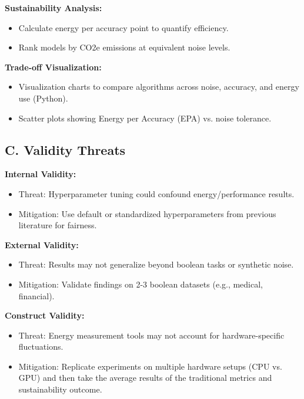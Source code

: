 \documentclass[conference]{IEEEtran}
\begin{document}
\textbf{Sustainability Analysis:}
\begin{itemize}
    \item Calculate energy per accuracy point to quantify efficiency.
    \item Rank models by CO2e emissions at equivalent noise levels.
\end{itemize}

\textbf{Trade-off Visualization:}
\begin{itemize}
    \item Visualization charts to compare algorithms across noise, accuracy, and energy use (Python).
    \item Scatter plots showing Energy per Accuracy (EPA) vs. noise tolerance.
\end{itemize}

\subsection*{C. Validity Threats}
\textbf{Internal Validity:}
\begin{itemize}
    \item Threat: Hyperparameter tuning could confound energy/performance results.
    \item Mitigation: Use default or standardized hyperparameters from previous literature for fairness.
\end{itemize}

\textbf{External Validity:}
\begin{itemize}
    \item Threat: Results may not generalize beyond boolean tasks or synthetic noise.
    \item Mitigation: Validate findings on 2-3 boolean datasets (e.g., medical, financial).
\end{itemize}

\textbf{Construct Validity:}
\begin{itemize}
    \item Threat: Energy measurement tools may not account for hardware-specific fluctuations.
    \item Mitigation: Replicate experiments on multiple hardware setups (CPU vs. GPU) and then take the average results of the traditional metrics and sustainability outcome.
\end{itemize}



\end{document}
